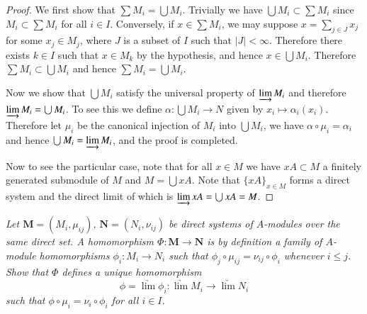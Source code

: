 \begin{proof}
We first show that $\sum M_i=\bigcup M_i$. Trivially we have $\bigcup M_i\subset\sum M_i$ since $M_i\subset\sum M_i$ for all $i\in I$. Conversely, if $x\in\sum M_i$, we may suppose $x=\sum_{j\in J}x_j$ for some $x_j\in M_j$, where $J$ is a subset of $I$ such that $|J|<\infty$. Therefore there exists $k\in I$ such that $x\in M_k$ by the hypothesis, and hence $x\in\bigcup M_i$. Therefore $\sum M_i\subset\bigcup M_i$ and hence $\sum M_i=\bigcup M_i$.\par
Now we show that $\bigcup M_i$ satisfy the universal property of $\varinjlim M_i$ and therefore $\varinjlim M_i=\bigcup M_i$. To see this we define $\alpha:\bigcup M_i\to N$ given by $x_i\mapsto\alpha_i(x_i)$. Therefore let $\mu_i$ be the canonical injection of $M_i$ into $\bigcup M_i$, we have $\alpha\circ\mu_i=\alpha_i$ and hence $\bigcup M_i=\varinjlim M_i$, and the proof is completed.\par
Now to see the particular case, note that for all $x\in M$ we have $xA\subset M$ a finitely generated submodule of $M$ and $M=\bigcup xA$. Note that $\{xA\}_{x\in M}$ forms a direct system and the direct limit of which is $\varinjlim xA=\bigcup xA=M$.
\end{proof}
\begin{problem}\em
Let $\mathbf{M}=(M_i,\mu_{ij})$, $\mathbf{N}=(N_i,\nu_{ij})$ be direct systems of $A$-modules over the same direct set. A homomorphism $\Phi:\mathbf{M}\to\mathbf{N}$ is by definition a family of $A$-module homomorphisms $\phi_i:M_i\to N_i$ such that $\phi_j\circ\mu_{ij}=\nu_{ij}\circ\phi_i$ whenever $i\le j$. Show that $\Phi$ defines a unique homomorphism 
$$
\phi =\underrightarrow{\lim }\phi _i:\underrightarrow{\lim }M_i\rightarrow \underrightarrow{\lim }N_i
$$
such that $\phi\circ\mu_i=\nu_i\circ\phi_i$ for all $i\in I$.
\end{problem}
